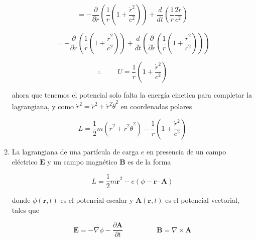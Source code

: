 \documentclass[12pt,a4paper]{article}
\begin{document}
\begin{enumerate}
    \begin{equation*}
        = - \frac{\partial}{\partial r} \left(\frac{1}{r} \left(1+\frac{\dot{r}^2}{c^2}\right)\right) + \frac{d}{dt} \left(\frac{1}{r} \frac{2 \dot{r}}{c^2}\right)
    \end{equation*}
    
    \begin{equation*}
        = - \frac{\partial}{\partial r} \left(\frac{1}{r} \left(1+\frac{\dot{r}^2}{c^2}\right)\right) + \frac{d}{dt} \left(\frac{\partial }{\partial \dot{r}}\left(\frac{1}{r} \left(1+\frac{\dot{r}^2}{c^2}\right)\right)\right)
    \end{equation*}
    
    \begin{equation*}
        \therefore \hspace{1cm} U = \frac{1}{r} \left(1+\frac{\dot{r}^2}{c^2}\right)
    \end{equation*}
    
    ahora que tenemos el potencial solo falta la energía cinetica para completar la lagrangiana, y como $\dot{r}^2 = \dot{r}^2 + \dot{r}^2 \dot{\theta}^2$ en coordenadas polares
    
    \begin{equation*}
        L = \frac{1}{2} m (\dot{r}^2 + \dot{r}^2 \dot{\theta}^2) - \frac{1}{r} \left(1+\frac{\dot{r}^2}{c^2}\right)
    \end{equation*}
    
    
    
    
    
    
    
    \item La lagrangiana de una partícula de carga $e$ en presencia de un campo eléctrico $\mathbf{E}$ y un campo magnético $\mathbf{B}$ es de la forma
    
    \begin{equation*}
         L = \frac{1}{2} m \dot{\mathbf{r}}^2 - e(\phi - \dot{\mathbf{r}} \cdot \mathbf{A})
    \end{equation*}
    
    donde $\phi(\mathbf{r}, t)$ es el potencial escalar y $\mathbf{A}(\mathbf{r},t)$ es el potencial vectorial, tales que
    
    \begin{equation*}
        \mathbf{E} = - \nabla \phi - \frac{\partial \mathbf{A}}{\partial t} \hspace{2cm} \mathbf{B} = \nabla \times \mathbf{A}
    \end{equation*}
    

\end{enumerate}
\end{document}
